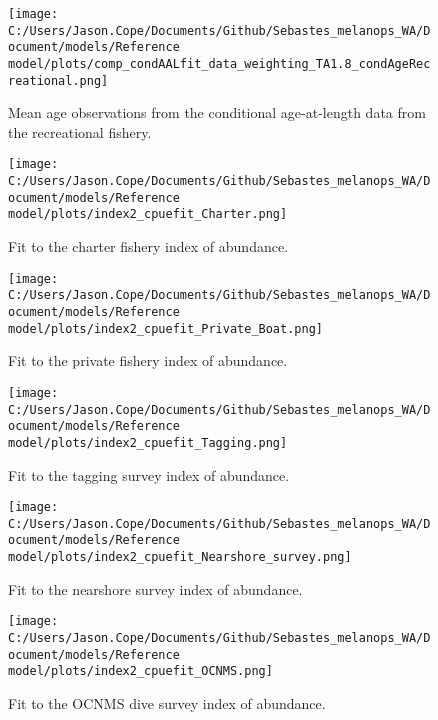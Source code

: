\documentclass[11pt,
  english,
  letterpaper,
]{article}
\begin{document}
\pagebreak

\begin{figure}
\centering
\texttt{[image: C:/Users/Jason.Cope/Documents/Github/Sebastes\_melanops\_WA/Document/models/Reference model/plots/comp\_condAALfit\_data\_weighting\_TA1.8\_condAgeRecreational.png]}
\caption{Mean age observations from the conditional age-at-length data from the recreational fishery.\label{fig:rec-mean-caal}}
\end{figure}

\pagebreak

\begin{figure}
\centering
\texttt{[image: C:/Users/Jason.Cope/Documents/Github/Sebastes\_melanops\_WA/Document/models/Reference model/plots/index2\_cpuefit\_Charter.png]}
\caption{Fit to the charter fishery index of abundance.\label{fig:charter-index-fit}}
\end{figure}

\pagebreak

\begin{figure}
\centering
\texttt{[image: C:/Users/Jason.Cope/Documents/Github/Sebastes\_melanops\_WA/Document/models/Reference model/plots/index2\_cpuefit\_Private\_Boat.png]}
\caption{Fit to the private fishery index of abundance.\label{fig:private-index-fit}}
\end{figure}

\pagebreak

\begin{figure}
\centering
\texttt{[image: C:/Users/Jason.Cope/Documents/Github/Sebastes\_melanops\_WA/Document/models/Reference model/plots/index2\_cpuefit\_Tagging.png]}
\caption{Fit to the tagging survey index of abundance.\label{fig:tag-index-fit}}
\end{figure}

\pagebreak

\begin{figure}
\centering
\texttt{[image: C:/Users/Jason.Cope/Documents/Github/Sebastes\_melanops\_WA/Document/models/Reference model/plots/index2\_cpuefit\_Nearshore\_survey.png]}
\caption{Fit to the nearshore survey index of abundance.\label{fig:nearshore-index-fit}}
\end{figure}

\pagebreak

\begin{figure}
\centering
\texttt{[image: C:/Users/Jason.Cope/Documents/Github/Sebastes\_melanops\_WA/Document/models/Reference model/plots/index2\_cpuefit\_OCNMS.png]}
\caption{Fit to the OCNMS dive survey index of abundance.\label{fig:ocnms-index-fit}}
\end{figure}
\end{document}
